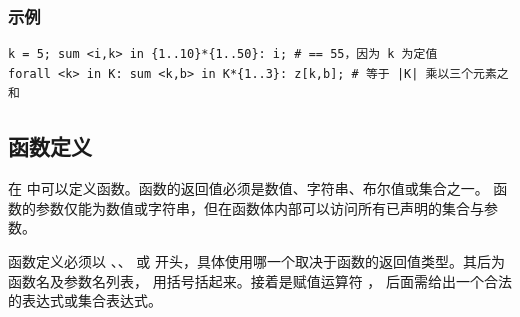 \subsubsection{示例}
{\small
\begin{verbatim}
k = 5; sum <i,k> in {1..10}*{1..50}: i; # == 55，因为 k 为定值
forall <k> in K: sum <k,b> in K*{1..3}: z[k,b]; # 等于 |K| 乘以三个元素之和
\end{verbatim}
}

\subsection{函数定义}

在 \zimpl 中可以定义函数。函数的返回值必须是数值、字符串、布尔值或集合之一。  
函数的参数仅能为数值或字符串，但在函数体内部可以访问所有已声明的集合与参数。


函数定义必须以 、、 或 
开头，具体使用哪一个取决于函数的返回值类型。其后为函数名及参数名列表，
用括号括起来。接着是赋值运算符 \code{:=}，
后面需给出一个合法的表达式或集合表达式。

